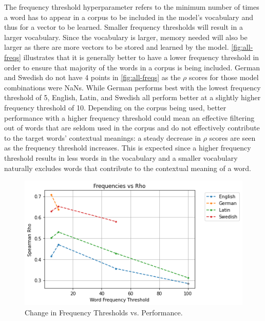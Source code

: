 The frequency threshold hyperparameter refers to the minimum number of times a word has to appear in a corpus to be included in the model’s vocabulary and thus for a vector to be learned. Smaller frequency thresholds will result in a larger vocabulary. Since the vocabulary is larger, memory needed will also be larger as there are more vectors to be stored and learned by the model.  \autoref{fig:all-freqs} illustrates that it is generally better to have a lower frequency threshold in order to ensure that majority of the words in a corpus is being included. German and Swedish do not have 4 points in \autoref{fig:all-freqs} as the $\rho$ scores for those model combinations were NaNs. While German performs best with the lowest frequency threshold of 5, English, Latin, and Swedish all perform better at a slightly higher frequency threshold of 10. Depending on the corpus being used, better performance with a higher frequency threshold could mean an effective filtering out of words that are seldom used in the corpus and do not effectively contribute to the target words' contextual meanings: a steady decrease in $\rho$ scores are seen as the frequency threshold increases. This is expected since a higher frequency threshold results in less words in the vocabulary and a smaller vocabulary naturally excludes words that contribute to the contextual meaning of a word. 

\begin{figure}[h]
  \centering
  \includegraphics[width=.8\linewidth]{sections/figures/freqs_all.png}
  \caption{Change in Frequency Thresholds vs. Performance.}
  \label{fig:all-freqs}
\end{figure}

